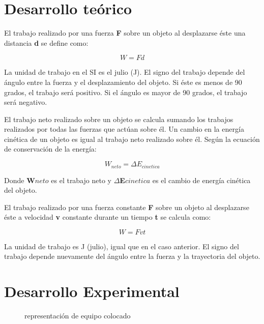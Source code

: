 \documentclass{article}
\begin{document}

\begin{multicols}{2}

\section{Desarrollo teórico}\label{Desarrollo Teorico}                              	%
El trabajo realizado por una fuerza \textbf{F} sobre un objeto al desplazarse éste una distancia \textbf{d} se define como:

\begin{equation}
W=Fd
\end{equation}

La unidad de trabajo en el SI es el julio (J). El signo del trabajo depende del ángulo entre la fuerza y el desplazamiento del objeto. Si éste es menos de 90 grados, el trabajo será positivo. Si el ángulo es mayor de 90 grados, el trabajo será negativo.

El trabajo neto realizado sobre un objeto se calcula sumando los trabajos realizados por todas las fuerzas que actúan sobre él. Un cambio en la energía cinética de un objeto es igual al trabajo neto realizado sobre él. Según la ecuación de conservación de la energía:

\begin{equation}
W_{neto} = \Delta E_{cinetica}
\end{equation}

Donde \textbf{W${neto}$} es el trabajo neto y \textbf{$\Delta$E${cinetica}$} es el cambio de energía cinética del objeto.

El trabajo realizado por una fuerza constante \textbf{F} sobre un objeto al desplazarse éste a velocidad \textbf{v} constante durante un tiempo \textbf{t} se calcula como:

\begin{equation}
W=Fvt
\end{equation}

La unidad de trabajo es J (julio), igual que en el caso anterior. El signo del trabajo depende nuevamente del ángulo entre la fuerza y la trayectoria del objeto.

\section{Desarrollo Experimental}\label{Desarrollo experimental}				%

\begin{figure}[H]
	\centering	
	\caption{representación de equipo colocado}
	\label{fig:1}
\end{figure}


\end{multicols}
\end{document}
